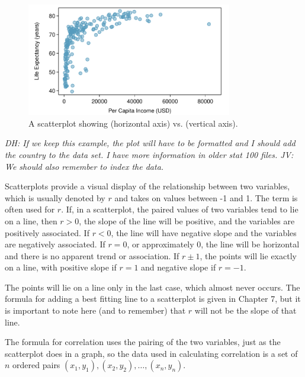 \begin{figure}[h]
\centering
\includegraphics[width=0.8\textwidth]
{ch_intro_to_data_oi_biostat/figures/incomeLifeExpectancy/incomeLifeExpectancy.pdf}
\caption{A scatterplot showing  (horizontal axis) vs.   (vertical axis).} 
\label{incomeLifeExpectancy}
\end{figure}

\textit{DH: If we keep this example, the plot will have to be formatted and I should add the country to the data set.  I have more information in older stat 100 files. JV: We should also remember to index the data.}

Scatterplots provide a visual display of the relationship between two variables, which is usually denoted by $r$ and takes on values between -1 and 1.  The term  is often used for $r$. If, in a scatterplot, the paired values of two variables tend to lie on a line, then $r > 0$, the slope of the line will be positive, and the variables are positively associated.
If $r < 0$, the line will have negative slope and the variables are negatively associated.
If $r = 0$, or approximately 0, the line will be horizontal and there is no apparent trend or association.
If $r \pm 1$, the points will lie exactly on a line, with positive slope if $r = 1$ and negative slope if $r = -1$.

The points will lie on a line only in the last case, which almost never occurs.  The formula for adding a best fitting line to a scatterplot is given in Chapter 7, but it is important to note here (and to remember) that $r$ will not be the slope of that line.

The formula for correlation uses the pairing of the two variables, just as the scatterplot does in a graph, so the data used in calculating correlation is a set of $n$ ordered pairs $(x_1,y_1), (x_2,y_2), \ldots, (x_n, y_n) $.

